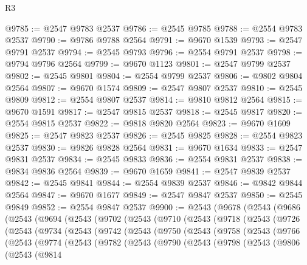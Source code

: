 \begin{lexlean}{R3}
\begin{coremodule}
@9785 := @2547 @9783 @2537
@9786 := @2545 @9785
@9788 := @2554 @9783 @2537
@9790 := @9786 @9788 @2564
@9791 := @9670 @1539
@9793 := @2547 @9791 @2537
@9794 := @2545 @9793
@9796 := @2554 @9791 @2537
@9798 := @9794 @9796 @2564
@9799 := @9670 @1123
@9801 := @2547 @9799 @2537
@9802 := @2545 @9801
@9804 := @2554 @9799 @2537
@9806 := @9802 @9804 @2564
@9807 := @9670 @1574
@9809 := @2547 @9807 @2537
@9810 := @2545 @9809
@9812 := @2554 @9807 @2537
@9814 := @9810 @9812 @2564
@9815 := @9670 @1591
@9817 := @2547 @9815 @2537
@9818 := @2545 @9817
@9820 := @2554 @9815 @2537
@9822 := @9818 @9820 @2564
@9823 := @9670 @1609
@9825 := @2547 @9823 @2537
@9826 := @2545 @9825
@9828 := @2554 @9823 @2537
@9830 := @9826 @9828 @2564
@9831 := @9670 @1634
@9833 := @2547 @9831 @2537
@9834 := @2545 @9833
@9836 := @2554 @9831 @2537
@9838 := @9834 @9836 @2564
@9839 := @9670 @1659
@9841 := @2547 @9839 @2537
@9842 := @2545 @9841
@9844 := @2554 @9839 @2537
@9846 := @9842 @9844 @2564
@9847 := @9670 @1677
@9849 := @2547 @9847 @2537
@9850 := @2545 @9849
@9852 := @2554 @9847 @2537
@9900 := @2543
    (@9678
      (@2543
        (@9686
          (@2543
            (@9694
              (@2543
                (@9702
                  (@2543
                    (@9710
                      (@2543
                        (@9718
                          (@2543
                            (@9726
                              (@2543
                                (@9734
                                  (@2543
                                    (@9742
                                      (@2543
                                        (@9750
                                          (@2543
                                            (@9758
                                              (@2543
                                                (@9766
                                                  (@2543
                                                    (@9774
                                                      (@2543
                                                        (@9782
                                                          (@2543
                                                            (@9790
                                                              (@2543
                                                                (@9798
                                                                  (@2543
                                                                    (@9806
                                                                      (@2543
                                                                        (@9814

\end{coremodule}
\end{lexlean}
